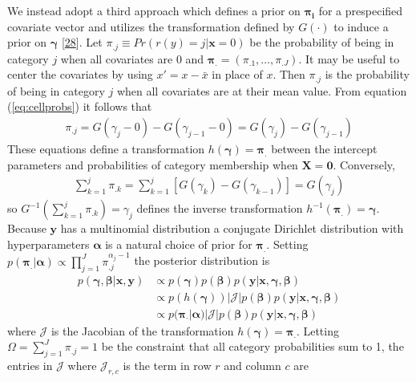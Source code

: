 \documentclass[
]{article}
\begin{document}
We instead adopt a third approach which defines a prior on \(\boldsymbol{\pi_i}\) for a prespecified covariate vector and utilizes the transformation defined by \(G(\cdot)\) to induce a prior on \(\boldsymbol{\gamma}\) {[}\protect\hyperlink{ref-betancourt_ordinal_2019}{28}{]}.
Let \(\pi_{.j} \equiv Pr(r(y)=j|\boldsymbol{x}=0)\) be the probability of being in category \(j\) when all covariates are 0 and \(\boldsymbol{\pi_{.}}=(\pi_{.1},\ldots,\pi_{.J})\).
It may be useful to center the covariates by using \(x'=x-\bar{x}\) in place of \(x\). Then \(\pi_{.j}\) is the probability of being in category \(j\) when all covariates are at their mean value. From equation (\ref{eq:cellprobs}) it follows that
\begin{gather}
\pi_{.j}=G(\gamma_j-0)-G(\gamma_{j-1}-0)=G(\gamma_j)-G(\gamma_{j-1})
\end{gather}
These equations define a transformation \(h(\boldsymbol{\gamma})=\boldsymbol{\pi_{.}}\) between the intercept parameters and probabilities of category membership when \(\boldsymbol{X}=\boldsymbol{0}\). Conversely,
\begin{gather}
\label{eq:invtrans}
\sum_{k=1}^{j}\pi_{.k}=\sum_{k=1}^{j}\left[G(\gamma_k)-G(\gamma_{k-1})\right]=G(\gamma_j)
\end{gather}
so \(G^{-1}\left(\sum_{k=1}^{j}\pi_{.k}\right)=\gamma_j\) defines the inverse transformation \(h^{-1}(\boldsymbol{\pi_{.}})=\boldsymbol{\gamma}\). Because \(\boldsymbol{y}\) has a multinomial distribution a conjugate Dirichlet distribution with hyperparameters \(\boldsymbol{\alpha}\) is a natural choice of prior for \(\boldsymbol{\pi_{.}}\). Setting \(p(\boldsymbol{\pi_{.}}|\boldsymbol{\alpha}) \propto \prod_{j=1}^{J}\pi_{.j}^{\alpha_j-1}\) the posterior distribution is
\begin{align}
p(\boldsymbol{\gamma},\boldsymbol{\beta}|\boldsymbol{x},\boldsymbol{y}) & \propto p(\boldsymbol{\gamma})p(\boldsymbol{\beta}) p(\boldsymbol{y}|\boldsymbol{x},\boldsymbol{\gamma},\boldsymbol{\beta})\\
&\propto p(h(\boldsymbol{\gamma}))|\mathcal{J}|p(\boldsymbol{\beta}) p(\boldsymbol{y}|\boldsymbol{x},\boldsymbol{\gamma},\boldsymbol{\beta})\\
\label{eq:post}
&\propto p(\boldsymbol{\pi_{\cdot}}|\boldsymbol{\alpha})|\mathcal{J}|p(\boldsymbol{\beta}) p(\boldsymbol{y}|\boldsymbol{x},\boldsymbol{\gamma},\boldsymbol{\beta})
\end{align}
where \(\mathcal{J}\) is the Jacobian of the transformation \(h(\boldsymbol{\gamma})=\boldsymbol{\pi_{.}}\). Letting \(\Omega=\sum_{j=1}^J\pi_{.j}=1\) be the constraint that all category probabilities sum to 1, the entries in \(\mathcal{J}\) where \(\mathcal{J}_{r,c}\) is the term in row \(r\) and column \(c\) are
\end{document}
